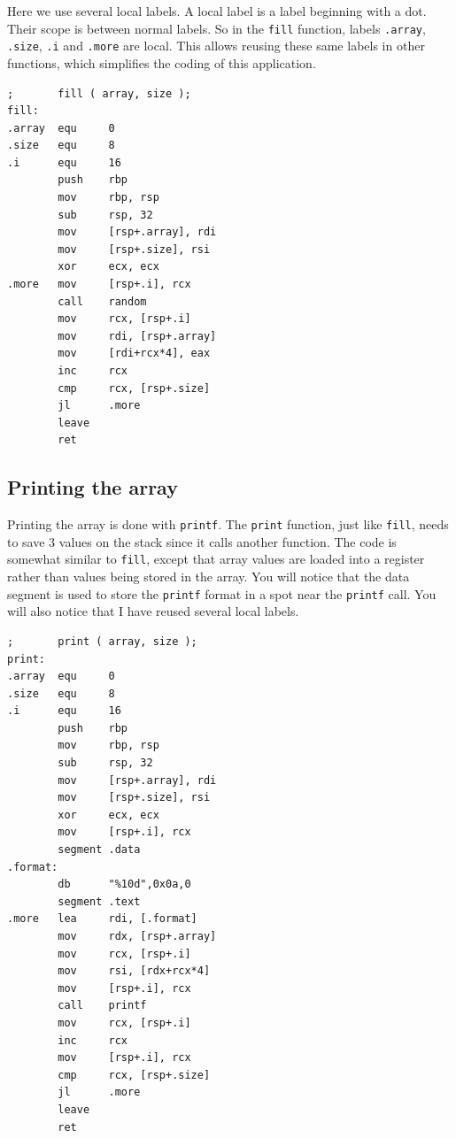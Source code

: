 \documentclass[11pt,b5paper]{book}
\begin{document}
Here we use several local labels.
A local label is a label beginning with a dot.
Their scope is between normal labels.
So in the {\tt fill} function, labels {\tt .array}, {\tt .size}, {\tt .i}
and {\tt .more} are local.
This allows reusing these same labels in other functions, which simplifies
the coding of this application.

\begin{verbatim}
;       fill ( array, size );
fill:
.array  equ     0
.size   equ     8
.i      equ     16
        push    rbp
        mov     rbp, rsp
        sub     rsp, 32
        mov     [rsp+.array], rdi
        mov     [rsp+.size], rsi
        xor     ecx, ecx
.more   mov     [rsp+.i], rcx
        call    random
        mov     rcx, [rsp+.i]
        mov     rdi, [rsp+.array]
        mov     [rdi+rcx*4], eax
        inc     rcx
        cmp     rcx, [rsp+.size]
        jl      .more
        leave
        ret
\end{verbatim}

\subsection{Printing the array}

Printing the array is done with {\tt printf}.
The {\tt print} function, just like {\tt fill}, needs to save 3 values
on the stack since it calls another function.
The code is somewhat similar to {\tt fill}, except that array values are
loaded into a register rather than values being stored in the array.
You will notice that the data segment is used to store the {\tt printf} format
in a spot near the {\tt printf} call.
You will also notice that I have reused several local labels.

\begin{verbatim}
;       print ( array, size );
print:
.array  equ     0
.size   equ     8
.i      equ     16
        push    rbp
        mov     rbp, rsp
        sub     rsp, 32
        mov     [rsp+.array], rdi
        mov     [rsp+.size], rsi
        xor     ecx, ecx
        mov     [rsp+.i], rcx
        segment .data
.format:
        db      "%10d",0x0a,0
        segment .text
.more   lea     rdi, [.format]
        mov     rdx, [rsp+.array]
        mov     rcx, [rsp+.i]
        mov     rsi, [rdx+rcx*4]
        mov     [rsp+.i], rcx
        call    printf
        mov     rcx, [rsp+.i]
        inc     rcx
        mov     [rsp+.i], rcx
        cmp     rcx, [rsp+.size]
        jl      .more
        leave
        ret
\end{verbatim}
\end{document}
